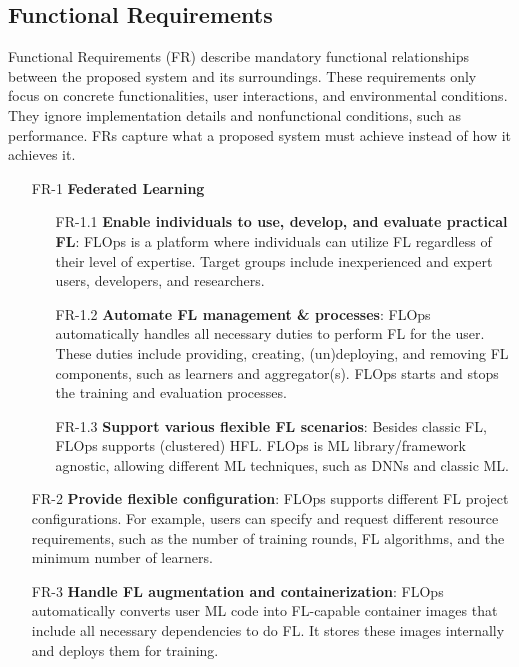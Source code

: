 \subsection{Functional Requirements}
Functional Requirements (FR) describe mandatory functional relationships between the proposed system and its surroundings.
These requirements only focus on concrete functionalities, user interactions, and environmental conditions.
They ignore implementation details and nonfunctional conditions, such as performance.
FRs capture what a proposed system must achieve instead of how it achieves it. \cite{book:bruegge}

\begin{itemize}
    \item [FR-1] {\textbf{Federated Learning}}
        \begin{itemize}
        \item [FR-1.1] \textbf{Enable individuals to use, develop, and evaluate practical FL}:
            FLOps is a platform where individuals can utilize FL regardless of their level of expertise.
            Target groups include inexperienced and expert users, developers, and researchers.
        \item [FR-1.2] \textbf{Automate FL management \& processes}:
            FLOps automatically handles all necessary duties to perform FL for the user.
            These duties include providing, creating, (un)deploying, and removing FL components, such as learners and aggregator(s).
            FLOps starts and stops the training and evaluation processes.
        \item [FR-1.3] \textbf{Support various flexible FL scenarios}:
            Besides classic FL, FLOps supports (clustered) HFL.
            FLOps is ML library/framework agnostic, allowing different ML techniques, such as DNNs and classic ML.
        \end{itemize}
    \item [FR-2] {\textbf{Provide flexible configuration}}:
        FLOps supports different FL project configurations.
        For example, users can specify and request different resource requirements, such as the number of training rounds, FL algorithms, and the minimum number of learners.
    \item [FR-3] {\textbf{Handle FL augmentation and containerization}}:
        FLOps automatically converts user ML code into FL-capable container images that include all necessary dependencies to do FL.
        It stores these images internally and deploys them for training.

\end{itemize}
